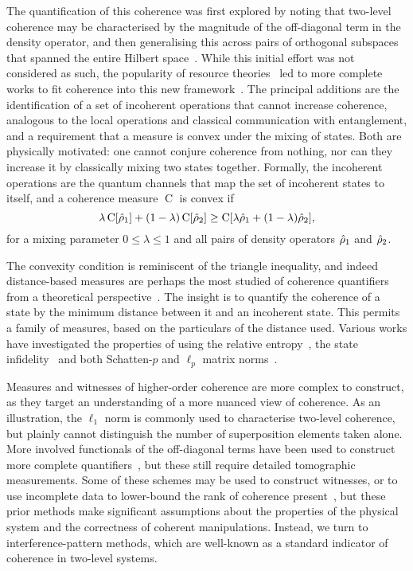 The quantification of this coherence was first explored by noting that two-level coherence may be characterised by the magnitude of the off-diagonal term in the density operator, and then generalising this across pairs of orthogonal subspaces that spanned the entire Hilbert space~\cite{Aberg2006}.
While this initial effort was not considered as such, the popularity of resource theories~\cite{Chitambar2019} led to more complete works to fit coherence into this new framework~\cite{Levi2014,Baumgratz2014}.
The principal additions are the identification of a set of incoherent operations that cannot increase coherence, analogous to the local operations and classical communication with entanglement, and a requirement that a measure is convex under the mixing of states.
Both are physically motivated: one cannot conjure coherence from nothing, nor can they increase it by classically mixing two states together.
Formally, the incoherent operations are the quantum channels that map the set of incoherent states to itself, and a coherence measure $\operatorname C$ is convex if
\begin{equation}\label{eq:coherence-convexity}
\lambda \operatorname C[\hat{\rho}_1] + (1 - \lambda) \operatorname C[\hat{\rho}_2] \ge \operatorname C[\lambda\hat{\rho}_1 + (1-\lambda)\hat{\rho}_2],
\end{equation}
for a mixing parameter $0\le\lambda\le1$ and all pairs of density operators $\hat{\rho}_1$ and $\hat{\rho}_2$.

The convexity condition is reminiscent of the triangle inequality, and indeed distance-based measures are perhaps the most studied of coherence quantifiers from a theoretical perspective~\cite{Streltsov2017}.
The insight is to quantify the coherence of a state by the minimum distance between it and an incoherent state.
This permits a family of measures, based on the particulars of the distance used.
Various works have investigated the properties of using the relative entropy~\cite{Baumgratz2014,Winter2016}, the state infidelity~\cite{Streltsov2015} and both Schatten-$p$ and $\ell_p$ matrix norms~\cite{Baumgratz2014,Rana2016}.

Measures and witnesses of higher-order coherence are more complex to construct, as they target an understanding of a more nuanced view of coherence.
As an illustration, the $\ell_1$ norm is commonly used to characterise two-level coherence, but plainly cannot distinguish the number of superposition elements taken alone.
More involved functionals of the off-diagonal terms have been used to construct more complete quantifiers~\cite{Levi2014,Ringbauer2018}, but these still require detailed tomographic measurements.
Some of these schemes may be used to construct witnesses, or to use incomplete data to lower-bound the rank of coherence present~\cite{Ringbauer2018}, but these prior methods make significant assumptions about the properties of the physical system and the correctness of coherent manipulations.
Instead, we turn to interference-pattern methods, which are well-known as a standard indicator of coherence in two-level systems.


